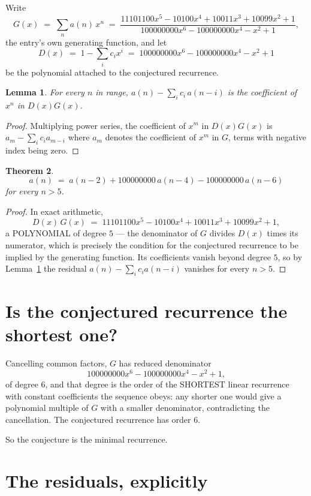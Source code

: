 \documentclass[11pt,a4paper]{article}
\theoremstyle{plain}
\newtheorem{theorem}{Theorem}
\newtheorem{lemma}[theorem]{Lemma}
\theoremstyle{definition}
\begin{document}
Write
\[
G(x)\;=\;\sum_{n}a(n)\,x^{n}\;=\;\frac{11101100 x^{5} - 10100 x^{4} + 10011 x^{3} + 10099 x^{2} + 1}{100000000 x^{6} - 100000000 x^{4} - x^{2} + 1},
\]
the entry's own generating function, and let
\[
D(x)\;=\;1-\sum_i c_i x^{i}\;=\;100000000 x^{6} - 100000000 x^{4} - x^{2} + 1
\]
be the polynomial attached to the conjectured recurrence.

\begin{lemma}\label{lem:key}
For every $n$ in range, $a(n)-\sum_i c_i\,a(n-i)$ is the coefficient of $x^{n}$ in
$D(x)G(x)$.
\end{lemma}

\begin{proof}
Multiplying power series, the coefficient of $x^{m}$ in $D(x)G(x)$ is
$a_m-\sum_i c_i a_{m-i}$ where $a_m$ denotes the coefficient of $x^{m}$ in $G$, terms with
negative index being zero.
\end{proof}

\begin{theorem}
\[
a(n)\;=\;a(n-2) + 100000000\,a(n-4) - 100000000\,a(n-6)
\]
for every $n>5$.
\end{theorem}

\begin{proof}
In exact arithmetic,
\[
D(x)\,G(x)\;=\;11101100 x^{5} - 10100 x^{4} + 10011 x^{3} + 10099 x^{2} + 1,
\]
a POLYNOMIAL of degree $5$ --- the denominator of $G$ divides $D(x)$ times its numerator,
which is precisely the condition for the conjectured recurrence to be implied by the
generating function. Its coefficients vanish beyond degree $5$, so by
Lemma~\ref{lem:key} the residual $a(n)-\sum_ic_ia(n-i)$ vanishes for every
$n>5$.
\end{proof}

\section{Is the conjectured recurrence the shortest one?}

Cancelling common factors, $G$ has reduced denominator
\[
100000000 x^{6} - 100000000 x^{4} - x^{2} + 1,
\]
of degree $6$, and that degree is the order of the SHORTEST linear recurrence with
constant coefficients the sequence obeys: any shorter one would give a polynomial multiple of
$G$ with a smaller denominator, contradicting the cancellation. The conjectured recurrence has
order $6$.

So the conjecture is the minimal recurrence.

\section{The residuals, explicitly}
\end{document}
